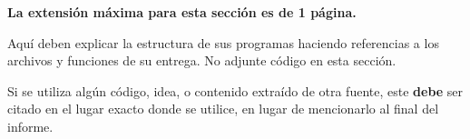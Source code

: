 \begin{mdframed}
    \textbf{La extensión máxima para esta sección es de 1 página.}
\end{mdframed}

Aquí deben explicar la estructura de sus programas haciendo referencias a los archivos y funciones de su entrega. No adjunte código en esta sección.
\begin{mdframed}
    Si se utiliza algún código, idea, o contenido extraído de otra fuente, este \textbf{debe} ser citado en el lugar exacto donde se utilice, en lugar de mencionarlo al final del informe.\\
\end{mdframed}